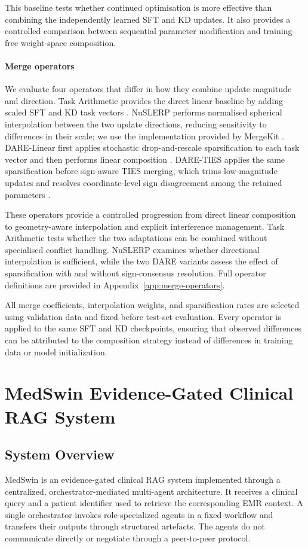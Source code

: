 \documentclass[conference]{IEEEtran}
\begin{document}
This baseline tests whether continued optimisation is more effective than combining the independently learned SFT and KD updates. It also provides a controlled comparison between sequential parameter modification and training-free weight-space composition.

\paragraph{Merge operators}

We evaluate four operators that differ in how they combine update magnitude and direction. Task Arithmetic provides the direct linear baseline by adding scaled SFT and KD task vectors \cite{ilharco2022editing}. NuSLERP performs normalised spherical interpolation between the two update directions, reducing sensitivity to differences in their scale; we use the implementation provided by MergeKit \cite{goddard2024arcee}. DARE-Linear first applies stochastic drop-and-rescale sparsification to each task vector and then performs linear composition \cite{yu2024language}. DARE-TIES applies the same sparsification before sign-aware TIES merging, which trims low-magnitude updates and resolves coordinate-level sign disagreement among the retained parameters \cite{yu2024language,yadav2023ties}.

These operators provide a controlled progression from direct linear composition to geometry-aware interpolation and explicit interference management. Task Arithmetic tests whether the two adaptations can be combined without specialised conflict handling. NuSLERP examines whether directional interpolation is sufficient, while the two DARE variants assess the effect of sparsification with and without sign-consensus resolution. Full operator definitions are provided in Appendix~\ref{app:merge-operators}.

All merge coefficients, interpolation weights, and sparsification rates are selected using validation data and fixed before test-set evaluation. Every operator is applied to the same SFT and KD checkpoints, ensuring that observed differences can be attributed to the composition strategy instead of differences in training data or model initialization.

\section{MedSwin Evidence-Gated Clinical RAG System}
\label{sec:medswin-system}

\subsection{System Overview}
\label{sec:system-overview}
MedSwin is an evidence-gated clinical RAG system implemented through a centralized, orchestrator-mediated multi-agent architecture. It receives a clinical query and a patient identifier used to retrieve the corresponding EMR context. A single orchestrator invokes role-specialized agents in a fixed workflow and transfers their outputs through structured artefacts. The agents do not communicate directly or negotiate through a peer-to-peer protocol.
\end{document}
